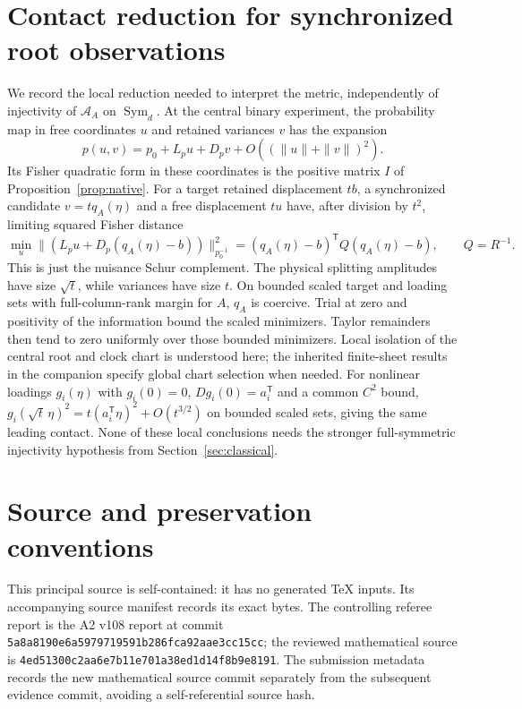 \documentclass[11pt,reqno]{amsart}
\numberwithin{equation}{section}
\theoremstyle{definition}\newtheorem{definition}[theorem]{Definition}
\theoremstyle{remark}\newtheorem{remark}[theorem]{Remark}
\newcommand{\Sym}{\operatorname{Sym}}
\begin{document}
\section{Contact reduction for synchronized root observations}\label{app:reduction}
We record the local reduction needed to interpret the metric, independently of injectivity of $\mathcal A_A$ on $\Sym_d$. At the central binary experiment, the probability map in free coordinates $u$ and retained variances $v$ has the expansion
\[
 p(u,v)=p_0+L_pu+D_pv+O((\|u\|+\|v\|)^2).
\]
Its Fisher quadratic form in these coordinates is the positive matrix $I$ of Proposition~\ref{prop:native}. For a target retained displacement $tb$, a synchronized candidate $v=tq_A(\eta)$ and a free displacement $tu$ have, after division by $t^2$, limiting squared Fisher distance
\[
 \min_u\|(L_pu+D_p(q_A(\eta)-b))\|_{p_0^{-1}}^2
 =(q_A(\eta)-b)^{\mathsf T}Q(q_A(\eta)-b),\qquad Q=R^{-1}.
\]
This is just the nuisance Schur complement. The physical splitting amplitudes have size $\sqrt t$, while variances have size $t$. On bounded scaled target and loading sets with full-column-rank margin for $A$, $q_A$ is coercive. Trial at zero and positivity of the information bound the scaled minimizers. Taylor remainders then tend to zero uniformly over those bounded minimizers. Local isolation of the central root and clock chart is understood here; the inherited finite-sheet results in the companion specify global chart selection when needed. For nonlinear loadings $g_i(\eta)$ with $g_i(0)=0$, $Dg_i(0)=a_i^{\mathsf T}$ and a common $C^2$ bound, $g_i(\sqrt t\,\eta)^2=t(a_i^{\mathsf T}\eta)^2+O(t^{3/2})$ on bounded scaled sets, giving the same leading contact. None of these local conclusions needs the stronger full-symmetric injectivity hypothesis from Section~\ref{sec:classical}.

\section{Source and preservation conventions}
This principal source is self-contained: it has no generated TeX inputs. Its accompanying source manifest records its exact bytes. The controlling referee report is the A2 v108 report at commit \texttt{5a8a8190e6a5979719591b286fca92aae3cc15cc}; the reviewed mathematical source is \texttt{4ed51300c2aa6e7b11e701a38ed1d14f8b9e8191}. The submission metadata records the new mathematical source commit separately from the subsequent evidence commit, avoiding a self-referential source hash.
\end{document}
